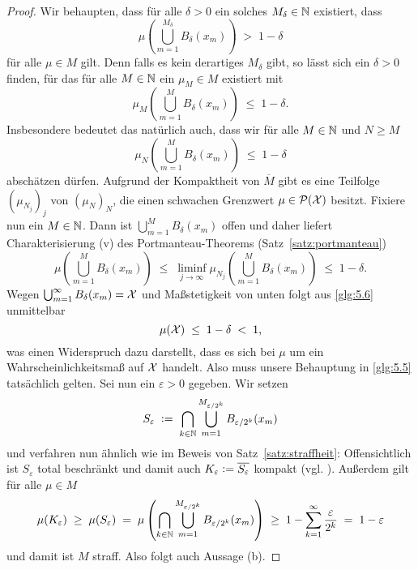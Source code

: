 \documentclass[../thesis/thesis.tex]{subfiles}
\begin{document}
\begin{proof}
		Wir behaupten, dass für alle $\delta > 0$ ein solches $M_\delta \in \mathbb{N}$ existiert, dass
		\[ \mu(\bigcup_{m=1}^{M_\delta} B_\delta(x_m)) \; > \; 1 - \delta \label{glg:5.5} \tag{5.5} \]
		für alle $\mu \in M$ gilt. Denn falls es kein derartiges $M_\delta$ gibt, so lässt sich ein $\delta > 0$ finden, für das
		für alle $M \in \mathbb{N}$ ein $\mu_M \in M$ existiert mit
		\[ \mu_M(\bigcup_{m=1}^{M} B_\delta(x_m)) \; \leq \; 1 - \delta \text{.} \]
		Insbesondere bedeutet das natürlich auch, dass wir für alle $M \in \mathbb{N}$ und $N \geq M$ 
		\[ \mu_N(\bigcup_{m=1}^{M} B_\delta(x_m)) \; \leq \; 1 - \delta \]
		abschätzen dürfen. Aufgrund der Kompaktheit von $\overline{M}$ gibt es eine Teilfolge $(\mu_{N_j})_j$ von $(\mu_N)_N$, 
		die einen schwachen Grenzwert $\mu \in \mathcal{P}(\mathcal{X})$ besitzt. Fixiere nun ein $M \in \mathbb{N}$. 
		Dann ist $\bigcup_{m=1}^{M} B_\delta(x_m)$
		offen und daher liefert Charakterisierung (v) des Portmanteau-Theorems (Satz~\ref{satz:portmanteau})
		\[ \mu(\bigcup_{m=1}^{M} B_\delta(x_m)) 
		\; \leq \; \liminf_{j \to \infty} \mu_{N_j}(\bigcup_{m=1}^{M} B_\delta(x_m)) 
		\; \leq \; 1 - \delta \text{.} \label{glg:5.6} \tag{5.6} \]
		Wegen $\bigcup_{m=1}^{\infty} B_\delta(x_m) = \mathcal{X}$ und Maßstetigkeit von unten 
		folgt aus \eqref{glg:5.6} unmittelbar 
		\[ \mu(\mathcal{X}) \; \leq \; 1 - \delta \; < \; 1 \text{,} \]
		was einen Widerspruch dazu darstellt, dass es sich bei $\mu$ um ein 
		Wahrscheinlichkeitsmaß auf $\mathcal{X}$ handelt. Also muss unsere Behauptung in \eqref{glg:5.5} tatsächlich gelten.
		Sei nun ein $\varepsilon > 0$ gegeben. Wir setzen 
		\[ S_\varepsilon 
		\; \vcentcolon = \; \bigcap_{k \in \mathbb{N}} \bigcup_{m=1}^{M_{\varepsilon / 2^k}} 
		B_{\varepsilon / 2^k}(x_m) \]
		und verfahren nun ähnlich wie im Beweis von Satz~\ref{satz:straffheit}: Offensichtlich ist $S_\varepsilon$ total beschränkt und damit auch 
		$ K_\varepsilon \vcentcolon = \overline{S_\varepsilon}$ kompakt (vgl. \cite[Theorem 2.3.8]{Simon.2015}). 
		Außerdem gilt für alle $\mu \in M$
		\[
		\mu(K_\varepsilon) \; \geq \; \mu(S_\varepsilon) \; = \; \mu\left(\bigcap_{k \in \mathbb{N}} \bigcup_{m=1}^{M_{\varepsilon / 2^k}} 
		B_{\varepsilon / 2^k}(x_m)\right)
		\; \geq \; 1 - \sum_{k=1}^{\infty} \frac{\varepsilon}{2^k} \; = \; 1 - \varepsilon
		\]
		und damit ist $M$ straff. Also folgt auch Aussage (b).
	\end{proof}
	
\end{document}
